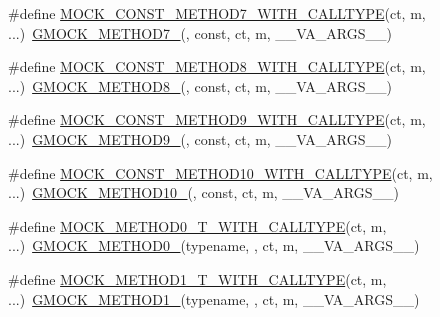 \begin{DoxyCompactItemize}
\item 
\#define \hyperlink{gmock-generated-function-mockers_8h_a66076ace4a10740c553080e5273f69c3}{M\+O\+C\+K\+\_\+\+C\+O\+N\+S\+T\+\_\+\+M\+E\+T\+H\+O\+D7\+\_\+\+W\+I\+T\+H\+\_\+\+C\+A\+L\+L\+T\+Y\+PE}(ct,  m, ...)~\hyperlink{gmock-generated-function-mockers_8h_ab98a8399ba62b53b375c2807f4d39d2f}{G\+M\+O\+C\+K\+\_\+\+M\+E\+T\+H\+O\+D7\+\_\+}(, const, ct, m, \+\_\+\+\_\+\+V\+A\+\_\+\+A\+R\+G\+S\+\_\+\+\_\+)
\item 
\#define \hyperlink{gmock-generated-function-mockers_8h_ab66f6bb289f1105f7c0dac3421c4a7f5}{M\+O\+C\+K\+\_\+\+C\+O\+N\+S\+T\+\_\+\+M\+E\+T\+H\+O\+D8\+\_\+\+W\+I\+T\+H\+\_\+\+C\+A\+L\+L\+T\+Y\+PE}(ct,  m, ...)~\hyperlink{gmock-generated-function-mockers_8h_aa84a36427c44505207b7cad5dec7ad67}{G\+M\+O\+C\+K\+\_\+\+M\+E\+T\+H\+O\+D8\+\_\+}(, const, ct, m, \+\_\+\+\_\+\+V\+A\+\_\+\+A\+R\+G\+S\+\_\+\+\_\+)
\item 
\#define \hyperlink{gmock-generated-function-mockers_8h_ad422a4d4cb5e3b91478e66a26c2af63e}{M\+O\+C\+K\+\_\+\+C\+O\+N\+S\+T\+\_\+\+M\+E\+T\+H\+O\+D9\+\_\+\+W\+I\+T\+H\+\_\+\+C\+A\+L\+L\+T\+Y\+PE}(ct,  m, ...)~\hyperlink{gmock-generated-function-mockers_8h_aa820171a19cc587c247dbe05cbffc55f}{G\+M\+O\+C\+K\+\_\+\+M\+E\+T\+H\+O\+D9\+\_\+}(, const, ct, m, \+\_\+\+\_\+\+V\+A\+\_\+\+A\+R\+G\+S\+\_\+\+\_\+)
\item 
\#define \hyperlink{gmock-generated-function-mockers_8h_a484ce7e8fbcc26b5145e893b48e7cd7d}{M\+O\+C\+K\+\_\+\+C\+O\+N\+S\+T\+\_\+\+M\+E\+T\+H\+O\+D10\+\_\+\+W\+I\+T\+H\+\_\+\+C\+A\+L\+L\+T\+Y\+PE}(ct,  m, ...)~\hyperlink{gmock-generated-function-mockers_8h_a81a48223a8771de36ef92ac6d56f6e81}{G\+M\+O\+C\+K\+\_\+\+M\+E\+T\+H\+O\+D10\+\_\+}(, const, ct, m, \+\_\+\+\_\+\+V\+A\+\_\+\+A\+R\+G\+S\+\_\+\+\_\+)
\item 
\#define \hyperlink{gmock-generated-function-mockers_8h_a68a3dcece1b6932b4dbda2216ff4fa90}{M\+O\+C\+K\+\_\+\+M\+E\+T\+H\+O\+D0\+\_\+\+T\+\_\+\+W\+I\+T\+H\+\_\+\+C\+A\+L\+L\+T\+Y\+PE}(ct,  m, ...)~\hyperlink{gmock-generated-function-mockers_8h_ae0d290ffa58d7c624b2e3487ba1252f4}{G\+M\+O\+C\+K\+\_\+\+M\+E\+T\+H\+O\+D0\+\_\+}(typename, , ct, m, \+\_\+\+\_\+\+V\+A\+\_\+\+A\+R\+G\+S\+\_\+\+\_\+)
\item 
\#define \hyperlink{gmock-generated-function-mockers_8h_a3028c1938f6b819b64400c426ef1e30d}{M\+O\+C\+K\+\_\+\+M\+E\+T\+H\+O\+D1\+\_\+\+T\+\_\+\+W\+I\+T\+H\+\_\+\+C\+A\+L\+L\+T\+Y\+PE}(ct,  m, ...)~\hyperlink{gmock-generated-function-mockers_8h_a1bc0012d62440dda77208dabdf4925c9}{G\+M\+O\+C\+K\+\_\+\+M\+E\+T\+H\+O\+D1\+\_\+}(typename, , ct, m, \+\_\+\+\_\+\+V\+A\+\_\+\+A\+R\+G\+S\+\_\+\+\_\+)

\end{DoxyCompactItemize}
